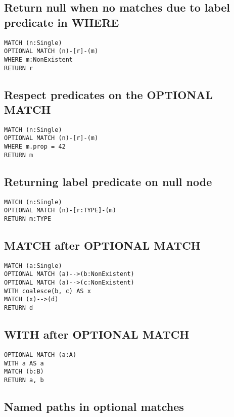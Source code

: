 \subsection{Return null when no matches due to label predicate in WHERE}

\begin{lstlisting}
MATCH (n:Single)
OPTIONAL MATCH (n)-[r]-(m)
WHERE m:NonExistent
RETURN r
\end{lstlisting}

\subsection{Respect predicates on the OPTIONAL MATCH}

\begin{lstlisting}
MATCH (n:Single)
OPTIONAL MATCH (n)-[r]-(m)
WHERE m.prop = 42
RETURN m
\end{lstlisting}

\subsection{Returning label predicate on null node}

\begin{lstlisting}
MATCH (n:Single)
OPTIONAL MATCH (n)-[r:TYPE]-(m)
RETURN m:TYPE
\end{lstlisting}

\subsection{MATCH after OPTIONAL MATCH}

\begin{lstlisting}
MATCH (a:Single)
OPTIONAL MATCH (a)-->(b:NonExistent)
OPTIONAL MATCH (a)-->(c:NonExistent)
WITH coalesce(b, c) AS x
MATCH (x)-->(d)
RETURN d
\end{lstlisting}

\subsection{WITH after OPTIONAL MATCH}

\begin{lstlisting}
OPTIONAL MATCH (a:A)
WITH a AS a
MATCH (b:B)
RETURN a, b
\end{lstlisting}

\subsection{Named paths in optional matches}

